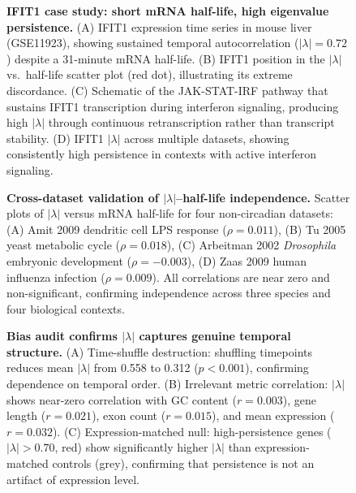 \documentclass[11pt,letterpaper]{article}
\begin{document}
\begin{figure}[H]
\caption{\textbf{IFIT1 case study: short mRNA half-life, high eigenvalue persistence.} (A) IFIT1 expression time series in mouse liver (GSE11923), showing sustained temporal autocorrelation ($|\lambda| = 0.72$) despite a 31-minute mRNA half-life. (B) IFIT1 position in the $|\lambda|$ vs.\ half-life scatter plot (red dot), illustrating its extreme discordance. (C) Schematic of the JAK-STAT-IRF pathway that sustains IFIT1 transcription during interferon signaling, producing high $|\lambda|$ through continuous retranscription rather than transcript stability. (D) IFIT1 $|\lambda|$ across multiple datasets, showing consistently high persistence in contexts with active interferon signaling.}
\label{fig:ifit1}
\end{figure}

\begin{figure}[H]
\caption{\textbf{Cross-dataset validation of $|\lambda|$--half-life independence.} Scatter plots of $|\lambda|$ versus mRNA half-life for four non-circadian datasets: (A) Amit 2009 dendritic cell LPS response ($\rho = 0.011$), (B) Tu 2005 yeast metabolic cycle ($\rho = 0.018$), (C) Arbeitman 2002 \textit{Drosophila} embryonic development ($\rho = -0.003$), (D) Zaas 2009 human influenza infection ($\rho = 0.009$). All correlations are near zero and non-significant, confirming independence across three species and four biological contexts.}
\label{fig:crossval}
\end{figure}

\begin{figure}[H]
\caption{\textbf{Bias audit confirms $|\lambda|$ captures genuine temporal structure.} (A) Time-shuffle destruction: shuffling timepoints reduces mean $|\lambda|$ from 0.558 to 0.312 ($p < 0.001$), confirming dependence on temporal order. (B) Irrelevant metric correlation: $|\lambda|$ shows near-zero correlation with GC content ($r = 0.003$), gene length ($r = 0.021$), exon count ($r = 0.015$), and mean expression ($r = 0.032$). (C) Expression-matched null: high-persistence genes ($|\lambda| > 0.70$, red) show significantly higher $|\lambda|$ than expression-matched controls (grey), confirming that persistence is not an artifact of expression level.}
\label{fig:bias}
\end{figure}
\end{document}
